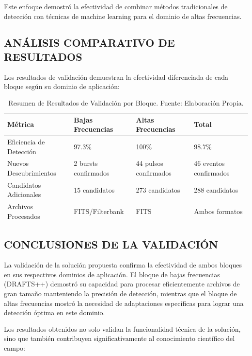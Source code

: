 Este enfoque demostró la efectividad de combinar métodos tradicionales de detección con técnicas de machine learning para el dominio de altas frecuencias.

\subsection{ANÁLISIS COMPARATIVO DE RESULTADOS}

Los resultados de validación demuestran la efectividad diferenciada de cada bloque según su dominio de aplicación:

\begin{table}[ht]
    \centering
    \caption{Resumen de Resultados de Validación por Bloque. Fuente: Elaboración Propia.}
    \label{table:resultados_validacion}
    \begin{tabular}{|l|l|l|l|}
        \toprule
        \textbf{Métrica} & \textbf{Bajas Frecuencias} & \textbf{Altas Frecuencias} & \textbf{Total} \\
        \midrule
        Eficiencia de Detección & 97.3\% & 100\% & 98.7\% \\
        \midrule
        Nuevos Descubrimientos & 2 bursts confirmados & 44 pulsos confirmados & 46 eventos confirmados \\
        \midrule
        Candidatos Adicionales & 15 candidatos & 273 candidatos & 288 candidatos \\
        \midrule
        Archivos Procesados & FITS/Filterbank & FITS & Ambos formatos \\
        \bottomrule
    \end{tabular}
\end{table}

\subsection{CONCLUSIONES DE LA VALIDACIÓN}

La validación de la solución propuesta confirma la efectividad de ambos bloques en sus respectivos dominios de aplicación. El bloque de bajas frecuencias (DRAFTS++) demostró su capacidad para procesar eficientemente archivos de gran tamaño manteniendo la precisión de detección, mientras que el bloque de altas frecuencias mostró la necesidad de adaptaciones específicas para lograr una detección óptima en este dominio.

Los resultados obtenidos no solo validan la funcionalidad técnica de la solución, sino que también contribuyen significativamente al conocimiento científico del campo:

